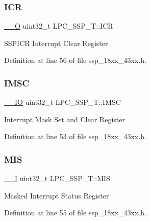 \subsubsection{\texorpdfstring{I\+CR}{ICR}}
{\footnotesize\ttfamily \hyperlink{core__sc300_8h_a7e25d9380f9ef903923964322e71f2f6}{\+\_\+\+\_\+O} uint32\+\_\+t L\+P\+C\+\_\+\+S\+S\+P\+\_\+\+T\+::\+I\+CR}

S\+S\+P\+I\+CR Interrupt Clear Register 

Definition at line 56 of file ssp\+\_\+18xx\+\_\+43xx.\+h.

\mbox{\label{struct_l_p_c___s_s_p___t_a5969572eaab7a02f4bbd7c898f93ca73}} 
\subsubsection{\texorpdfstring{I\+M\+SC}{IMSC}}
{\footnotesize\ttfamily \hyperlink{core__sc300_8h_aec43007d9998a0a0e01faede4133d6be}{\+\_\+\+\_\+\+IO} uint32\+\_\+t L\+P\+C\+\_\+\+S\+S\+P\+\_\+\+T\+::\+I\+M\+SC}

Interrupt Mask Set and Clear Register 

Definition at line 53 of file ssp\+\_\+18xx\+\_\+43xx.\+h.

\mbox{\label{struct_l_p_c___s_s_p___t_aa4b72809de09f83335e72d0d0844a90b}} 
\subsubsection{\texorpdfstring{M\+IS}{MIS}}
{\footnotesize\ttfamily \hyperlink{core__sc300_8h_af63697ed9952cc71e1225efe205f6cd3}{\+\_\+\+\_\+I} uint32\+\_\+t L\+P\+C\+\_\+\+S\+S\+P\+\_\+\+T\+::\+M\+IS}

Masked Interrupt Status Register 

Definition at line 55 of file ssp\+\_\+18xx\+\_\+43xx.\+h.

\mbox{\label{struct_l_p_c___s_s_p___t_a0aa742f8d7d4b2e2a6038b01dbc1aa5b}} 

